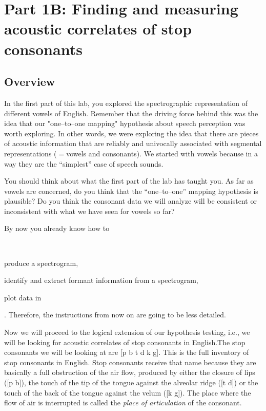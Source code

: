 \section{Part 1B: Finding and measuring acoustic correlates of stop consonants}

\subsection{Overview}

In the first part of this lab, you explored the spectrographic representation of different vowels of English. Remember that the driving force behind this was the idea that our "one--to--one mapping" hypothesis about speech perception was worth exploring. In other words, we were exploring the idea that there are pieces of acoustic information that are reliably and univocally associated with segmental representations ($=$vowels and consonants). We started with vowels because in a way they are the ``simplest'' case of speech sounds.

You should think about what the first part of the lab has taught you. As far as vowels are concerned, do you think  that the ``one--to--one'' mapping hypothesis is plausible? Do you think the consonant data we will analyze will be consistent or inconsistent with what we have seen for vowels so far?

By now you already know how to\begin{inparaenum}[(a)]~\item produce a spectrogram, \item identify and extract formant information from a spectrogram, \item plot data in \Praat{}\end{inparaenum}. Therefore, the instructions from now on are going to be less detailed.

Now we will proceed to the logical extension of our hypothesis testing, i.e., we will be looking for acoustic correlates of stop consonants in English.The stop consonants we will be looking at are [p b t d k g]. This is the full inventory of stop consonants in English. Stop consonants receive that name because they are basically a full obstruction of the air flow, produced by either the closure of lips ([p b]), the touch of the tip of the tongue against the alveolar ridge ([t d]) or the touch of the back of the tongue against the velum ([k g]). The place where the flow of air is interrupted is called the \emph{place of articulation} of the consonant.

